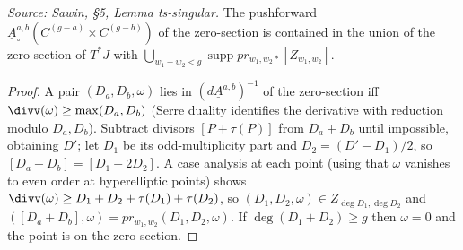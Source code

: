 \begin{lemma}
  \label{lem:sawin_ts_singular}
  \textit{Source: Sawin, §5, Lemma ts-singular.}
  The pushforward $\underline A^{a,b}_\circ(C^{(g-a)}\times C^{(g-b)})$ of the
  zero-section is contained in the union of the zero-section of $T^*J$ with
  $\bigcup_{w_1+w_2<g}\operatorname{supp} pr_{w_1,w_2*}[Z_{w_1,w_2}]$.
\end{lemma}
\begin{proof}
  A pair $(D_a,D_b,\omega)$ lies in $(d\underline A^{a,b})^{-1}$ of the
  zero-section iff $\divv(\omega)\ge\max(D_a,D_b)$ (Serre duality identifies the
  derivative with reduction modulo $D_a,D_b$).  Subtract divisors $[P+\tau(P)]$
  from $D_a+D_b$ until impossible, obtaining $D'$; let $D_1$ be its odd-multiplicity
  part and $D_2=(D'-D_1)/2$, so $[D_a+D_b]=[D_1+2D_2]$.  A case analysis at each
  point (using that $\omega$ vanishes to even order at hyperelliptic points) shows
  $\divv(\omega)\ge D_1+D_2+\tau(D_1)+\tau(D_2)$, so $(D_1,D_2,\omega)\in
  Z_{\deg D_1,\deg D_2}$ and $([D_a+D_b],\omega)=pr_{w_1,w_2}(D_1,D_2,\omega)$.  If
  $\deg(D_1+D_2)\ge g$ then $\omega=0$ and the point is on the zero-section.
\end{proof}

